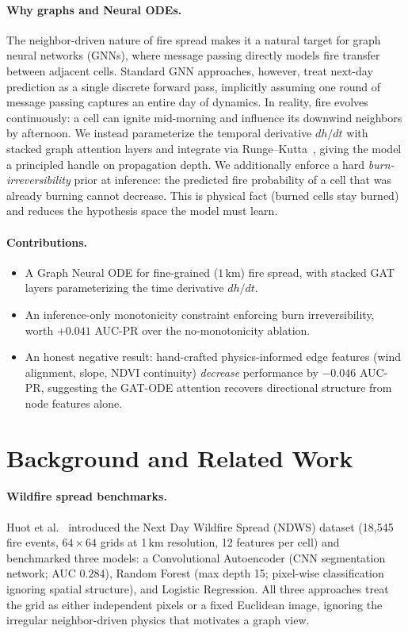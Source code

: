 \documentclass{article}
\begin{document}
\paragraph{Why graphs and Neural ODEs.} The neighbor-driven nature of fire
spread makes it a natural target for graph neural networks (GNNs), where
message passing directly models fire transfer between adjacent cells. Standard
GNN approaches, however, treat next-day prediction as a single discrete forward
pass, implicitly assuming one round of message passing captures an entire
day of dynamics. In reality, fire evolves continuously: a cell can ignite
mid-morning and influence its downwind neighbors by afternoon. We instead
parameterize the temporal derivative $dh/dt$ with stacked graph attention
layers and integrate via Runge--Kutta~\cite{chen2018neuralode}, giving the
model a principled handle on propagation depth. We additionally enforce a
hard \emph{burn-irreversibility} prior at inference: the predicted fire
probability of a cell that was already burning cannot decrease. This is
physical fact (burned cells stay burned) and reduces the hypothesis space
the model must learn.

\paragraph{Contributions.}
\begin{itemize}\itemsep0pt
\item A Graph Neural ODE for fine-grained ($1\,\mathrm{km}$) fire spread, with
stacked GAT layers parameterizing the time derivative $dh/dt$.
\item An inference-only monotonicity constraint enforcing burn irreversibility,
worth $+0.041$ AUC-PR over the no-monotonicity ablation.
\item An honest negative result: hand-crafted physics-informed edge features
(wind alignment, slope, NDVI continuity) \emph{decrease} performance by
$-0.046$ AUC-PR, suggesting the GAT-ODE attention recovers directional
structure from node features alone.
\end{itemize}

\section{Background and Related Work}\label{sec:related}

\paragraph{Wildfire spread benchmarks.} Huot et al.~\cite{huot2022nextday}
introduced the Next Day Wildfire Spread (NDWS) dataset (18,545 fire events,
$64{\times}64$ grids at 1\,km resolution, 12 features per cell) and benchmarked
three models: a Convolutional Autoencoder (CNN segmentation network; AUC
$0.284$), Random Forest (max depth 15; pixel-wise classification ignoring
spatial structure), and Logistic Regression. All three approaches treat the
grid as either independent pixels or a fixed Euclidean image, ignoring the
irregular neighbor-driven physics that motivates a graph view.
\end{document}
